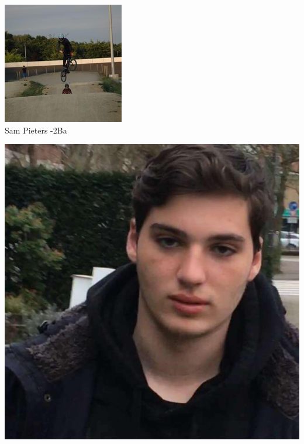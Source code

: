 \begin{frame}
\begin{minipage}{0.30\linewidth}
		\includegraphics[width=\linewidth]{res/sam} \\%
        \footnotesize Sam Pieters -2Ba \strut%
    \end{minipage}
    \begin{minipage}{0.30\linewidth}%
        \centering%
		\includegraphics[width=\linewidth]{res/mateo} \\%

\end{minipage}
\end{frame}
